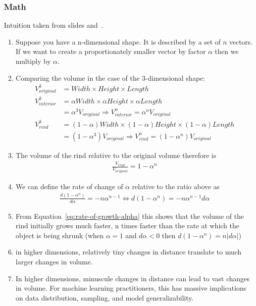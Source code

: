 \documentclass[11pt]{article}
\begin{document}
\subsubsection{Math}

Intuition taken from slides and~\cite{stackexchangeMathematicalDemonstration}.

\begin{enumerate}
    \item Suppose you have a n-dimensional shape. It is described by a set of $n$ vectors. If we want to create a proportionately smaller vector by factor $\alpha$ then we multiply by $\alpha$.
    \item Comparing the volume in the case of the 3-dimensional shape:
          \begin{align}
              V^3_{original} & =Width\times Height\times Length                                                                     \\
              V^3_{interior} & =\alpha Width\times \alpha Height\times \alpha Length                                                \\
                             & = \alpha^3 V_{original} \Rightarrow V^n_{interior} = \alpha^n V_{original}                           \\
              V^3_{rind}     & = (1-\alpha) Width\times (1-\alpha) Height\times (1-\alpha) Length\label{equ:rind-vs-interror-alpha} \\
                             & = (1-\alpha^3) V_{original} \Rightarrow V^n_{rind} = (1-\alpha^n) V_{original}
          \end{align}
    \item The volume of the rind relative to the original volume therefore is
          \begin{align}
              \frac{V_{rind}}{V_{original}} = 1 - \alpha^n
          \end{align}
    \item We can define the rate of change of $\alpha$ relative to the ratio above as
          \begin{align}
              \frac{d (1 - \alpha^n)}{d\alpha} = -n\alpha^{n-1} \iff d(1-\alpha^n) = -n\alpha^{n-1}d\alpha\label{eq:rate-of-growth-alpha}
          \end{align}
    \item From Equation~\ref{eq:rate-of-growth-alpha} this shows that the volume of the rind initially grows much faster, n times faster than the rate at which the object is being shrunk (when $\alpha=1$ and $d\alpha < 0$ then $d(1-\alpha^n)=n|d\alpha|$)
    \item in higher dimensions, relatively tiny changes in distance translate to much larger changes in volume.
    \item In higher dimensions, minuscule changes in distance can lead to vast changes in volume. For machine learning practitioners, this has massive implications on data distribution, sampling, and model generalizability.
\end{enumerate}
\end{document}
